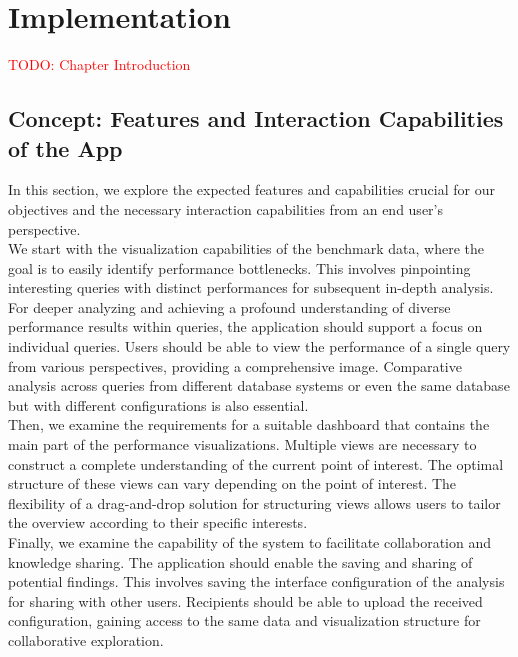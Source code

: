 
\chapter{Implementation}\label{chapter:implementation}
\textcolor{red}{TODO: Chapter Introduction}


\section{Concept: Features and Interaction Capabilities of the App}
In this section, we explore the expected features and capabilities crucial for our objectives and the necessary interaction capabilities from an end user's perspective.\\
We start with the visualization capabilities of the benchmark data, where the goal is to easily identify performance bottlenecks. This involves pinpointing interesting queries with distinct performances for subsequent in-depth analysis.\\
For deeper analyzing and achieving a profound understanding of diverse performance results within queries, the application should support a focus on individual queries. Users should be able to view the performance of a single query from various perspectives, providing a comprehensive image. Comparative analysis across queries from different database systems or even the same database but with different configurations is also essential.\\ 
Then, we examine the requirements for a suitable dashboard that contains the main part of the performance visualizations. Multiple views are necessary to construct a complete understanding of the current point of interest. The optimal structure of these views can vary depending on the point of interest. The flexibility of a drag-and-drop solution for structuring views allows users to tailor the overview according to their specific interests.\\
Finally, we examine the capability of the system to facilitate collaboration and knowledge sharing. The application should enable the saving and sharing of potential findings. This involves saving the interface configuration of the analysis for sharing with other users. Recipients should be able to upload the received configuration, gaining access to the same data and visualization structure for collaborative exploration.


